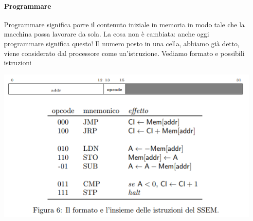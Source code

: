\paragraph{Programmare} Programmare significa porre il contenuto iniziale in memoria in modo tale che la macchina possa lavorare da sola. La cosa non è cambiata: anche oggi programmare significa questo! Il numero posto in una cella, abbiamo già detto, viene considerato dal processore come un'istruzione. Vediamo formato e possibili istruzioni
\begin{center}
	\includegraphics{img/1.PNG}
\end{center}
